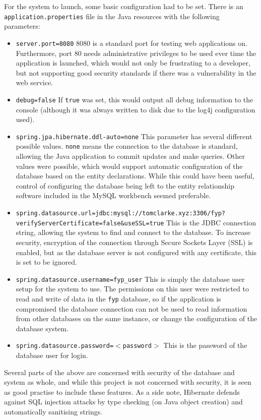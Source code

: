 For the system to launch, some basic configuration had to be set. There is an \texttt{application.properties} file in the Java resources with the following parameters:
\begin{itemize}
	\item \texttt{server.port=8080} 8080 is a standard port for testing web applications on. Furthermore, port 80 needs administrative privileges to be used ever time the application is launched, which would not only be frustrating to a developer, but not supporting good security standards if there was a vulnerability in the web service.
	\item \texttt{debug=false} If \texttt{true} was set, this would output all debug information to the console (although it was always written to disk due to the log4j configuration used).
	\item \texttt{spring.jpa.hibernate.ddl-auto=none} This parameter has several different possible values. \texttt{none} means the connection to the database is standard, allowing the Java application to commit updates and make queries. Other values were possible, which would support automatic configuration of the database based on the entity declarations. While this could have been useful, control of configuring the database being left to the entity relationship software included in the MySQL workbench seemed preferable.
	\item \texttt{spring.datasource.url=\newline jdbc:mysql://tomclarke.xyz:3306/fyp?verifyServerCertificate=false\&useSSL=true} This is the JDBC connection string, allowing the system to find and connect to the database. To increase security, encryption of the connection through Secure Sockets Layer (SSL) is enabled, but as the database server is not configured with any certificate, this is set to be ignored.
	\item \texttt{spring.datasource.username=fyp\_user} This is simply the database user setup for the system to use. The permissions on this user were restricted to read and write of data in the \texttt{fyp} database, so if the application is compromised the database connection can not be used to read information from other databases on the same instance, or change the configuration of the database system. 
	\item \texttt{spring.datasource.password=$<$password$>$} This is the password of the database user for login.
\end{itemize}

Several parts of the above are concerned with security of the database and system as whole, and while this project is not concerned with security, it is seen as good practise to include these features. As a side note, Hibernate defends against SQL injection attacks by type checking (on Java object creation) and automatically sanitising strings.

